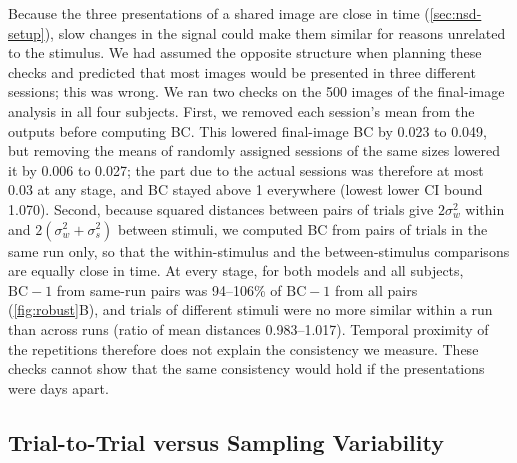 \documentclass[11pt,a4paper]{article}
\begin{document}
Because the three presentations of a shared image are close in time
(\cref{sec:nsd-setup}), slow changes in the signal could make them similar for
reasons unrelated to the stimulus. We had assumed the opposite structure when
planning these checks and predicted that most images would be presented in
three different sessions; this was wrong. We ran two checks on the 500 images of
the final-image analysis in all four subjects. First, we removed each session's
mean from the outputs before computing BC. This lowered final-image BC by 0.023
to 0.049, but removing the means of randomly assigned sessions of the same
sizes lowered it by 0.006 to 0.027; the part due to the actual sessions was
therefore at most 0.03 at any stage, and BC stayed above 1 everywhere (lowest
lower CI bound 1.070). Second, because squared distances between pairs of
trials give $2\sigma_w^2$ within and $2(\sigma_w^2+\sigma_s^2)$ between stimuli,
we computed BC from pairs of trials in the same run only, so that the
within-stimulus and the between-stimulus comparisons are equally close in time.
At every stage, for both models and all subjects, $\mathrm{BC}-1$ from
same-run pairs was 94--106\% of $\mathrm{BC}-1$ from all pairs
(\cref{fig:robust}B), and trials of different stimuli were no more similar
within a run than across runs (ratio of mean distances 0.983--1.017). Temporal
proximity of the repetitions therefore does not explain the consistency we
measure. These checks cannot show that the same consistency would hold if the
presentations were days apart.

\subsection{Trial-to-Trial versus Sampling Variability}
\label{sec:nsd-seed}
\end{document}
